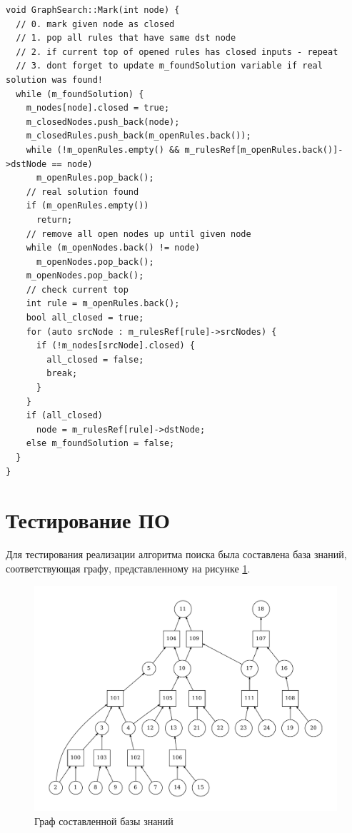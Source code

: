 \begin{lstlisting}
void GraphSearch::Mark(int node) {
  // 0. mark given node as closed
  // 1. pop all rules that have same dst node
  // 2. if current top of opened rules has closed inputs - repeat
  // 3. dont forget to update m_foundSolution variable if real solution was found!
  while (m_foundSolution) {
    m_nodes[node].closed = true;
    m_closedNodes.push_back(node);
    m_closedRules.push_back(m_openRules.back());
    while (!m_openRules.empty() && m_rulesRef[m_openRules.back()]->dstNode == node)
      m_openRules.pop_back();
    // real solution found
    if (m_openRules.empty())
      return;
    // remove all open nodes up until given node
    while (m_openNodes.back() != node)
      m_openNodes.pop_back();
    m_openNodes.pop_back();
    // check current top
    int rule = m_openRules.back();
    bool all_closed = true;
    for (auto srcNode : m_rulesRef[rule]->srcNodes) {
      if (!m_nodes[srcNode].closed) {
        all_closed = false;
        break;
      }
    }
    if (all_closed)
      node = m_rulesRef[rule]->dstNode;
    else m_foundSolution = false;
  }
}
\end{lstlisting}

\clearpage

\section{Тестирование ПО}

Для тестирования реализации алгоритма поиска была составлена база знаний, соответствующая графу, представленному на рисунке \ref{fig:graph0}.

\begin{figure}[h!]
    \centering
    \includegraphics[width=\linewidth]{img/kb.pdf}
    \caption{Граф составленной базы знаний}
    \label{fig:graph0}
\end{figure}


